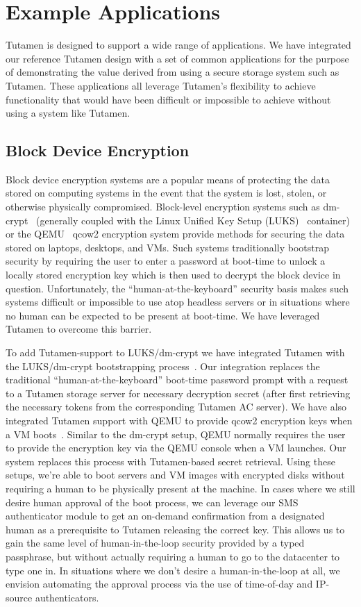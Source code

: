 \section{Example Applications}
\label{sec:apps}

Tutamen is designed to support a wide range of applications. We have
integrated our reference Tutamen design with a set of common
applications for the purpose of demonstrating the value derived from
using a secure storage system such as Tutamen. These applications all
leverage Tutamen's flexibility to achieve functionality that would
have been difficult or impossible to achieve without using a system
like Tutamen.

\subsection{Block Device Encryption}

Block device encryption systems are a popular means of protecting the
data stored on computing systems in the event that the system is lost,
stolen, or otherwise physically compromised.  Block-level encryption
systems such as dm-crypt~\cite{dm-crypt} (generally coupled with the
Linux Unified Key Setup (LUKS)~\cite{luks} container) or the
QEMU~\cite{qemu} qcow2 encryption system provide methods for securing
the data stored on laptops, desktops, and VMs. Such systems
traditionally bootstrap security by requiring the user to enter a
password at boot-time to unlock a locally stored encryption key which
is then used to decrypt the block device in question. Unfortunately,
the ``human-at-the-keyboard'' security basis makes such systems
difficult or impossible to use atop headless servers or in situations
where no human can be expected to be present at boot-time. We have
leveraged Tutamen to overcome this barrier.

To add Tutamen-support to LUKS/dm-crypt we have integrated Tutamen
with the LUKS/dm-crypt bootstrapping
process~\cite{src-tutamen-askpassword}. Our integration replaces the
traditional ``human-at-the-keyboard'' boot-time password prompt with a
request to a Tutamen storage server for necessary decryption secret
(after first retrieving the necessary tokens from the corresponding
Tutamen AC server). We have also integrated Tutamen support with QEMU
to provide qcow2 encryption keys when a VM
boots~\cite{src-qemu-tutamen}. Similar to the dm-crypt setup, QEMU
normally requires the user to provide the encryption key via the QEMU
console when a VM launches. Our system replaces this process with
Tutamen-based secret retrieval. Using these setups, we're able to boot
servers and VM images with encrypted disks without requiring a human
to be physically present at the machine. In cases where we still
desire human approval of the boot process, we can leverage our SMS
authenticator module to get an on-demand confirmation from a
designated human as a prerequisite to Tutamen releasing the correct
key. This allows us to gain the same level of human-in-the-loop
security provided by a typed passphrase, but without actually
requiring a human to go to the datacenter to type one in. In
situations where we don't desire a human-in-the-loop at all, we
envision automating the approval process via the use of time-of-day
and IP-source authenticators.

